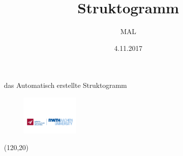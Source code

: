 \documentclass[12pt,a4paper]{article}
\title{Struktogramm}
\author{MAL}
\date{4.11.2017}
\begin{document}
\maketitle
das Automatisch erstellte Struktogramm
\begin{figure}
\centering
\includegraphics[width = 0.25\textwidth]{sla-logo}
\label{fig:logo1}
\end{figure}


\begin{struktogramm}(120,20)
\end{struktogramm}
\end{document}
